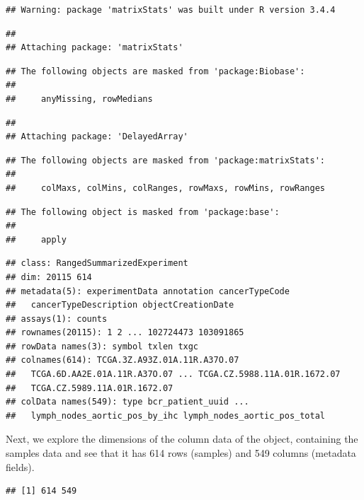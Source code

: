 \documentclass[]{article}
\begin{document}
\begin{verbatim}
## Warning: package 'matrixStats' was built under R version 3.4.4
\end{verbatim}

\begin{verbatim}
## 
## Attaching package: 'matrixStats'
\end{verbatim}

\begin{verbatim}
## The following objects are masked from 'package:Biobase':
## 
##     anyMissing, rowMedians
\end{verbatim}

\begin{verbatim}
## 
## Attaching package: 'DelayedArray'
\end{verbatim}

\begin{verbatim}
## The following objects are masked from 'package:matrixStats':
## 
##     colMaxs, colMins, colRanges, rowMaxs, rowMins, rowRanges
\end{verbatim}

\begin{verbatim}
## The following object is masked from 'package:base':
## 
##     apply
\end{verbatim}

\begin{verbatim}
## class: RangedSummarizedExperiment 
## dim: 20115 614 
## metadata(5): experimentData annotation cancerTypeCode
##   cancerTypeDescription objectCreationDate
## assays(1): counts
## rownames(20115): 1 2 ... 102724473 103091865
## rowData names(3): symbol txlen txgc
## colnames(614): TCGA.3Z.A93Z.01A.11R.A37O.07
##   TCGA.6D.AA2E.01A.11R.A37O.07 ... TCGA.CZ.5988.11A.01R.1672.07
##   TCGA.CZ.5989.11A.01R.1672.07
## colData names(549): type bcr_patient_uuid ...
##   lymph_nodes_aortic_pos_by_ihc lymph_nodes_aortic_pos_total
\end{verbatim}

Next, we explore the dimensions of the column data of the object,
containing the samples data and see that it has 614 rows (samples) and
549 columns (metadata fields).

\begin{verbatim}
## [1] 614 549
\end{verbatim}
\end{document}

